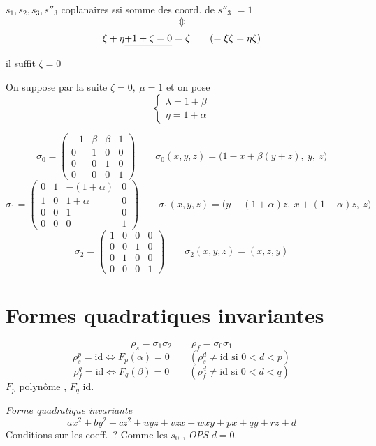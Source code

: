 \documentclass[11pt,a4paper]{article}
\begin{document}
$s_1, s_2, s_3, s''_3$ coplanaires ssi somme des coord. de $s''_3$ $= 1$
\[
\Updownarrow
\]
\[
\xi + \eta \struck{+1+\zeta = 0} = \zeta \qquad (= \xi\zeta = \eta\zeta)
\]
il suffit $\zeta = 0$

On suppose par la suite $\boxed{\zeta = 0,\ \mu = 1}$ et on pose
\[
\begin{cases}
\lambda = 1 + \beta \\
\eta = 1 + \alpha
\end{cases}
\]

\[
\sigma_0 = \begin{pmatrix}
-1 & \beta & \beta & 1 \\
0 & 1 & 0 & 0 \\
0 & 0 & 1 & 0 \\
0 & 0 & 0 & 1
\end{pmatrix}
\qquad
\sigma_0(x,y,z) = \bigl(1 - x + \beta(y+z),\ y,\ z\bigr)
\]
\[
\sigma_1 = \begin{pmatrix}
0 & 1 & -(1+\alpha) & 0 \\
1 & 0 & 1+\alpha & 0 \\
0 & 0 & 1 & 0 \\
0 & 0 & 0 & 1
\end{pmatrix}
\qquad
\sigma_1(x,y,z) = \bigl(y - (1+\alpha)z,\ x + (1+\alpha)z,\ z\bigr)
\]
\[
\sigma_2 = \begin{pmatrix}
1 & 0 & 0 & 0 \\
0 & 0 & 1 & 0 \\
0 & 1 & 0 & 0 \\
0 & 0 & 0 & 1
\end{pmatrix}
\qquad
\sigma_2(x,y,z) = (x, z, y)
\]

\section{Formes quadratiques invariantes}

\[
\rho_s = \sigma_1\sigma_2 \qquad \rho_f = \sigma_0\sigma_1
\]
\[
\rho_s^p = \mathrm{id} \iff F_p(\alpha) = 0 \qquad (\rho_s^d \neq \mathrm{id} \text{ si } 0 < d < p)
\]
\[
\rho_f^q = \mathrm{id} \iff F_q(\beta) = 0 \qquad (\rho_f^d \neq \mathrm{id} \text{ si } 0 < d < q)
\]
$F_p$ polynôme , $F_q$ id.

\emph{Forme quadratique invariante} 
\[
ax^2 + by^2 + cz^2 + uyz + vzx + wxy + px + qy + rz + d
\]
Conditions sur les coeff.\ ? Comme les   $s_0$ \ill{}, \emph{OPS} $d = 0$.
\end{document}
